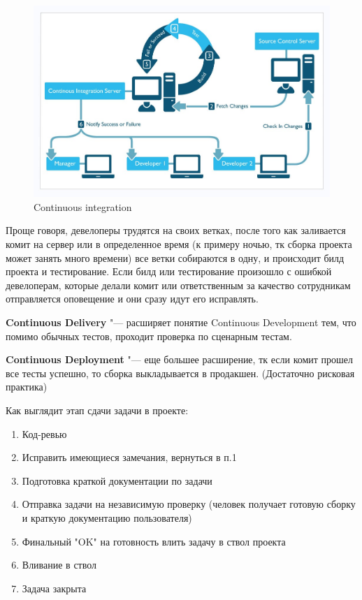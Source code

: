 \documentclass[bachelor, och, pract]{SCWorks}
\theoremstyle{remark}
\begin{document}
    \begin{figure}[H]
        \begin{center}
            \includegraphics[scale=0.7]{res/ContinuousIntegration.png}
            \caption{Continuous integration}
        \end{center}
    \end{figure}

    Проще говоря, девелоперы трудятся на своих ветках, после того как заливается комит на сервер или в определенное время (к примеру ночью, тк сборка проекта может занять много времени) все ветки собираются в одну, и происходит билд проекта и тестирование. Если билд или тестирование произошло с ошибкой девелоперам, которые делали комит или ответственным за качество сотрудникам отправляется оповещение и они сразу идут его исправлять.

    \textbf{Continuous Delivery} "--- расширяет понятие Continuous Development тем, что помимо обычных тестов, проходит проверка по сценарным тестам.

    \textbf{Continuous Deployment} "--- еще большее расширение, тк если комит прошел все тесты успешно, то сборка выкладывается в продакшен. (Достаточно рисковая практика)
    
    Как выглядит этап сдачи задачи в проекте:
    \begin{enumerate}
        \item  Код-ревью
        \item Исправить имеющиеся замечания, вернуться в п.1
        \item Подготовка краткой документации по задачи
        \item Отправка задачи на независимую проверку (человек получает готовую сборку и краткую документацию пользователя)
        \item Финальный "OK" на готовность влить задачу в ствол проекта
        \item Вливание в ствол 
        \item Задача закрыта
    \end{enumerate}
\end{document}
